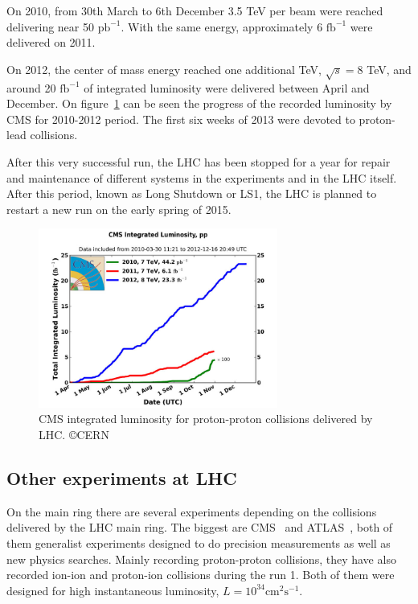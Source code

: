 On 2010, from 30th March to 6th December 3.5 TeV per beam were reached delivering near 50 $\text{pb}^{-1}$. With the same energy, approximately 6 $\text{fb}^{-1}$ were delivered on 2011. 

On 2012, the center of mass energy reached one additional TeV, $\sqrt{s}=8$ TeV, and around 20 $\text{fb}^{-1}$ of integrated luminosity were delivered between April and December. On figure~\ref{fig:CMSlumi} can be seen the progress of the recorded luminosity by CMS for 2010-2012 period. The first six weeks of 2013 were devoted to proton-lead collisions.

After this very successful run, the LHC has been stopped for a year for repair and maintenance of different systems in the experiments and in the LHC itself. After this period, known as Long Shutdown  or LS1, the LHC is planned to restart a new run on the early spring of 2015.

\begin{figure}[!Hhtbp]
  \begin{center}
    \includegraphics[width=0.7\textwidth]{figs/cms-int-10to12.jpg}
    \caption{CMS integrated luminosity for proton-proton collisions delivered by LHC. \copyright CERN}
    \label{fig:CMSlumi}
  \end{center}
\end{figure}

\subsection{Other experiments at LHC}
\label{sec:expers}

On the main ring there are several experiments depending on the collisions delivered by the LHC main ring. The biggest are CMS~\cite{Bayatian:922757} and ATLAS~\cite{ATLAS:1999}, both of them generalist experiments designed to do precision measurements as well as new physics searches. Mainly recording proton-proton collisions, they have also recorded ion-ion and proton-ion collisions during the run 1. Both of them were designed for high instantaneous luminosity, $L = 10^{34}\text{cm}^{2}\text{s}^{-1}$.

